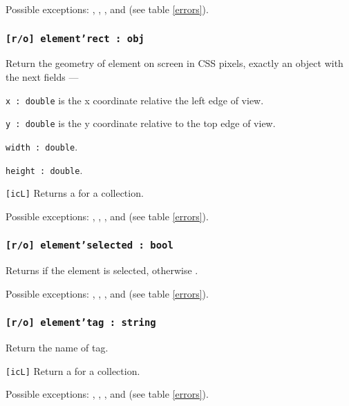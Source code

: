 Possible exceptions: , , ,  and  (see table \ref{errors}).

\subsubsection{\texttt{[r/o] element'rect : obj}}

Return the geometry of element on screen in CSS pixels, exactly an object with the next fields —
\begin{icItems}
	\item \texttt{x : double} is the x coordinate relative the left edge of view.
	\item \texttt{y : double} is the y coordinate relative to the top edge of view.
	\item \texttt{width : double}.
	\item \texttt{height : double}.
\end{icItems}

\texttt{[icL]} Returns a \set{} for a collection.

Possible exceptions: , , ,  and  (see table \ref{errors}).

\subsubsection{\texttt{[r/o] element'selected : bool}}

Returns \true{} if the element is selected, otherwise \false.

Possible exceptions: , , ,  and  (see table \ref{errors}).

\subsubsection{\texttt{[r/o] element'tag : string}}

Return the name of tag.

\texttt{[icL]} Return a \listtype{} for a collection.

Possible exceptions: , , ,  and  (see table \ref{errors}).

